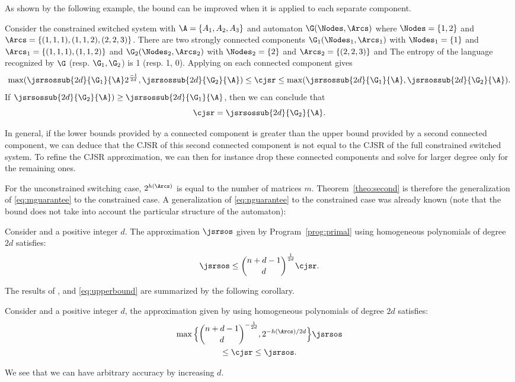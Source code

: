 \documentclass[11pt,twoside,a4paper,openright]{uclouvain-thesis}
\newcommand{\expfrac}[2]{#1/#2}
\begin{document}
As shown by the following example, the bound  can be improved when it is
applied to each separate component.
\begin{myexem}
  Consider the constrained switched system with $\A = \{A_1, A_2, A_3\}$
  and automaton $\G(\Nodes, \Arcs)$ where $\Nodes = \{1, 2\}$ and
  $\Arcs = \{(1, 1, 1), (1, 1, 2), (2, 2, 3)\}$.
  There are two strongly connected components
  $\G_1(\Nodes_1, \Arcs_1)$
  with $\Nodes_1 = \{1\}$ and
  $\Arcs_1 = \{(1, 1, 1), (1, 1, 2)\}$ and
  $\G_2(\Nodes_2, \Arcs_2)$
  with $\Nodes_2 = \{2\}$ and
  $\Arcs_2 = \{(2, 2, 3)\}$ and
  The entropy of the language recognized by $\G$ (resp. $\G_1, \G_2$) is 1
  (resp. 1, 0).
  Applying  on each connected component gives
  \[ \max(\jsrsossub{2d}{\G_1}{\A} 2^{\frac{-1}{2d}}, \jsrsossub{2d}{\G_2}{\A}) \leq \cjsr \leq \max(\jsrsossub{2d}{\G_1}{\A}, \jsrsossub{2d}{\G_2}{\A}). \]
  If $\jsrsossub{2d}{\G_2}{\A}) \ge \jsrsossub{2d}{\G_1}{\A}$, then we can conclude that
  \[ \cjsr = \jsrsossub{2d}{\G_2}{\A}. \]

  In general, if the lower bounds provided by a connected component is greater than
  the upper bound provided by a second connected component,
  we can deduce that the CJSR of this second connected component is not equal to the
  CJSR of the full constrained switched system.
  To refine the CJSR approximation, we can then for instance drop these connected
  components and solve  for larger degree only for the remaining ones.
\end{myexem}

For the unconstrained switching case, $2^{h(\Arcs)}$ is equal to the number of matrices $m$.
Theorem~\ref{theo:second} is therefore the generalization of \eqref{eq:mguarantee} to the constrained case. %
A generalization of \eqref{eq:nguarantee} to the constrained case was already known
(note that the bound does not take into account the particular structure of the automaton):
\begin{mytheo}
  \label{theo:matt}
  Consider  and a positive integer $d$.
  The approximation $\jsrsos$ given by Program~\ref{prog:primal} using homogeneous polynomials of degree $2d$
  satisfies:
  \[ \jsrsos \leq {n+d-1 \choose d}^{\frac{1}{2d}} \cjsr. \]
\end{mytheo}

The results of ,  and \eqref{eq:upperbound} are summarized by the following corollary.
\begin{mycoro}
  \label{coro:mix}
  Consider  and a positive integer $d$,
  the approximation given by  using homogeneous polynomials of degree $2d$
  satisfies:
  \begin{multline*}
    \max\Big\{{n+d-1 \choose d}^{-\frac{1}{2d}}, 2^{-\expfrac{h(\Arcs)}{2d}}\Big\} \jsrsos\\
    \leq \cjsr \leq \jsrsos.
  \end{multline*}
\end{mycoro}
We see that we can have arbitrary accuracy by increasing $d$.
\end{document}

